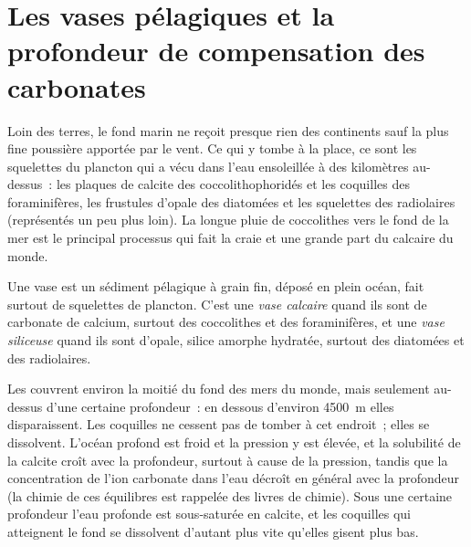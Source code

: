 \section{Les vases pélagiques et la profondeur de compensation des carbonates}\label{sec:b1:chemical-biogenic-sediments:oozes}

Loin des terres, le fond marin ne reçoit presque rien des continents sauf
la plus fine poussière apportée par le vent. Ce qui y tombe à la place, ce sont les squelettes du
plancton qui a vécu dans l'eau ensoleillée à des kilomètres au-dessus~: les plaques de calcite des
coccolithophoridés et les coquilles des foraminifères, les frustules d'opale des diatomées
et les squelettes des radiolaires
(représentés un peu plus loin). La longue pluie de coccolithes
vers le fond de la mer est le principal processus qui fait la craie et une grande part du
calcaire du monde.

\begin{definition}\label{def:b1:chemical-biogenic-sediments:ooze}
Une vase est un sédiment pélagique à grain fin, déposé en plein océan, fait
surtout de squelettes de plancton. C'est une \emph{vase
calcaire} quand ils sont de carbonate de calcium, surtout
des coccolithes et des foraminifères, et une \emph{vase siliceuse}
quand ils sont d'opale, silice amorphe hydratée, surtout des diatomées et
des radiolaires.
\end{definition}

Les  couvrent environ la moitié du fond des mers du monde, mais seulement au-dessus d'une
certaine profondeur~: en dessous d'environ \qty{4500}{m} elles disparaissent. Les coquilles ne cessent pas
de tomber à cet endroit~; elles se dissolvent. L'océan profond est froid et la pression y est élevée,
et la solubilité de la calcite croît avec la profondeur, surtout à cause de la
pression, tandis que la concentration de l'ion carbonate dans l'eau
décroît en général avec la profondeur (la chimie de ces équilibres est rappelée des
livres de chimie). Sous une certaine profondeur l'eau profonde est sous-saturée en calcite,
et les coquilles qui atteignent le fond se dissolvent d'autant plus vite qu'elles gisent plus bas.

